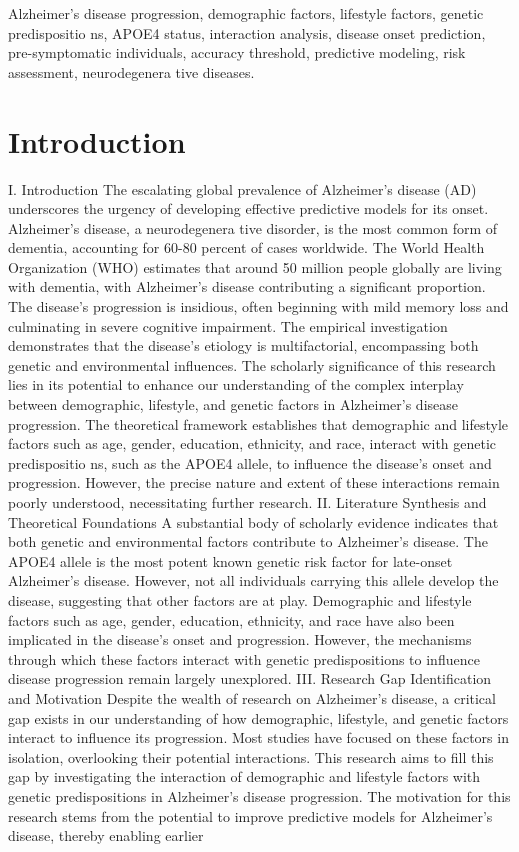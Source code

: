 \documentclass[conference]{IEEEtran}
\begin{document}
\begin{IEEEkeywords}
Alzheimer's disease progression, demographic factors, lifestyle factors, genetic predispositio ns, APOE4 status, interaction analysis, disease onset prediction, pre-symptomatic individuals, accuracy threshold, predictive modeling, risk assessment, neurodegenera tive diseases.
\end{IEEEkeywords}

\section{Introduction}
I. Introduction The escalating global prevalence of Alzheimer's disease (AD) underscores the urgency of developing effective predictive models for its onset. Alzheimer's disease, a neurodegenera tive disorder, is the most common form of dementia, accounting for 60-80 percent of cases worldwide. The World Health Organization (WHO) estimates that around 50 million people globally are living with dementia, with Alzheimer's disease contributing a significant proportion. The disease's progression is insidious, often beginning with mild memory loss and culminating in severe cognitive impairment. The empirical investigation demonstrates that the disease's etiology is multifactorial, encompassing both genetic and environmental influences. The scholarly significance of this research lies in its potential to enhance our understanding of the complex interplay between demographic, lifestyle, and genetic factors in Alzheimer's disease progression. The theoretical framework establishes that demographic and lifestyle factors such as age, gender, education, ethnicity, and race, interact with genetic predispositio ns, such as the APOE4 allele, to influence the disease's onset and progression. However, the precise nature and extent of these interactions remain poorly understood, necessitating further research. II. Literature Synthesis and Theoretical Foundations A substantial body of scholarly evidence indicates that both genetic and environmental factors contribute to Alzheimer's disease. The APOE4 allele is the most potent known genetic risk factor for late-onset Alzheimer's disease. However, not all individuals carrying this allele develop the disease, suggesting that other factors are at play. Demographic and lifestyle factors such as age, gender, education, ethnicity, and race have also been implicated in the disease's onset and progression. However, the mechanisms through which these factors interact with genetic predispositions to influence disease progression remain largely unexplored. III. Research Gap Identification and Motivation Despite the wealth of research on Alzheimer's disease, a critical gap exists in our understanding of how demographic, lifestyle, and genetic factors interact to influence its progression. Most studies have focused on these factors in isolation, overlooking their potential interactions. This research aims to fill this gap by investigating the interaction of demographic and lifestyle factors with genetic predispositions in Alzheimer's disease progression. The motivation for this research stems from the potential to improve predictive models for Alzheimer's disease, thereby enabling earlier 
\end{document}
